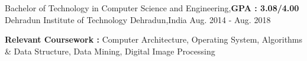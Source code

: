 \begin{cventries}
  \cventry
    {Bachelor of Technology  in Computer Science and Engineering,\textbf{GPA : 3.08/4.00}}
    {Dehradun Institute of Technology}
    {Dehradun,India}
    {Aug. 2014 - Aug. 2018}
    {
      \begin{cvitems}
        \item {\textbf{Relevant Coursework :} Computer Architecture, Operating System, Algorithms \& Data Structure, Data Mining, Digital Image Processing}
      \end{cvitems} 
    }
\end{cventries}

